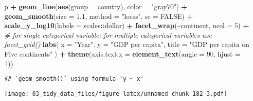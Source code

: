 \documentclass[
]{book}
\newenvironment{Shaded}{\begin{snugshade}}{\end{snugshade}}
\newcommand{\CommentTok}[1]{\textcolor[rgb]{0.56,0.35,0.01}{\textit{#1}}}
\newcommand{\DataTypeTok}[1]{\textcolor[rgb]{0.13,0.29,0.53}{#1}}
\newcommand{\DecValTok}[1]{\textcolor[rgb]{0.00,0.00,0.81}{#1}}
\newcommand{\FloatTok}[1]{\textcolor[rgb]{0.00,0.00,0.81}{#1}}
\newcommand{\KeywordTok}[1]{\textcolor[rgb]{0.13,0.29,0.53}{\textbf{#1}}}
\newcommand{\NormalTok}[1]{#1}
\newcommand{\OperatorTok}[1]{\textcolor[rgb]{0.81,0.36,0.00}{\textbf{#1}}}
\newcommand{\OtherTok}[1]{\textcolor[rgb]{0.56,0.35,0.01}{#1}}
\newcommand{\StringTok}[1]{\textcolor[rgb]{0.31,0.60,0.02}{#1}}
\begin{document}
\begin{Shaded}
\begin{Highlighting}[]
\NormalTok{p }\OperatorTok{+}\StringTok{ }\KeywordTok{geom\_line}\NormalTok{(}\KeywordTok{aes}\NormalTok{(}\DataTypeTok{group =}\NormalTok{ country), }\DataTypeTok{color =} \StringTok{"gray70"}\NormalTok{) }\OperatorTok{+}
\StringTok{  }\KeywordTok{geom\_smooth}\NormalTok{(}\DataTypeTok{size =} \FloatTok{1.1}\NormalTok{, }\DataTypeTok{method =} \StringTok{"loess"}\NormalTok{, }\DataTypeTok{se =} \OtherTok{FALSE}\NormalTok{) }\OperatorTok{+}
\StringTok{  }\KeywordTok{scale\_y\_log10}\NormalTok{(}\DataTypeTok{labels =}\NormalTok{ scales}\OperatorTok{::}\NormalTok{dollar) }\OperatorTok{+}
\StringTok{  }\KeywordTok{facet\_wrap}\NormalTok{(}\OperatorTok{\textasciitilde{}}\NormalTok{continent, }\DataTypeTok{ncol =} \DecValTok{5}\NormalTok{) }\OperatorTok{+}\StringTok{ }\CommentTok{\# for single categorical variable; for multiple categorical variables use facet\_grid()}
\StringTok{  }\KeywordTok{labs}\NormalTok{(}
    \DataTypeTok{x =} \StringTok{"Year"}\NormalTok{,}
    \DataTypeTok{y =} \StringTok{"GDP per capita"}\NormalTok{,}
    \DataTypeTok{title =} \StringTok{"GDP per capita on Five continents"}
\NormalTok{  ) }\OperatorTok{+}
\StringTok{  }\KeywordTok{theme}\NormalTok{(}\DataTypeTok{axis.text.x =} \KeywordTok{element\_text}\NormalTok{(}\DataTypeTok{angle =} \DecValTok{90}\NormalTok{, }\DataTypeTok{hjust =} \DecValTok{1}\NormalTok{))}
\end{Highlighting}
\end{Shaded}

\begin{verbatim}
## `geom_smooth()` using formula 'y ~ x'
\end{verbatim}

\texttt{[image: 03\_tidy\_data\_files/figure-latex/unnamed-chunk-182-3.pdf]}
\end{document}
